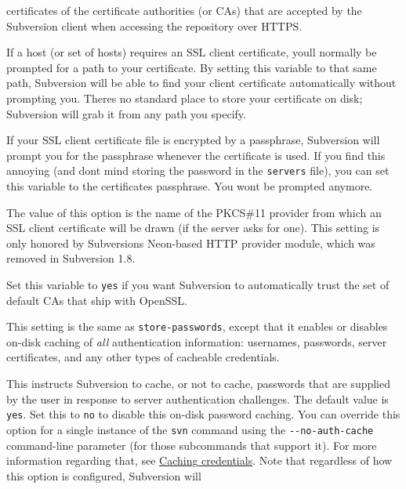 \begin{description}
certificates of the certificate authorities (or CAs) that are accepted
by the Subversion client when accessing the repository over HTTPS.
\item[\texttt{ssl-client-cert-file}]
If a host (or set of hosts) requires an SSL client certificate,
you\textquotesingle ll normally be prompted for a path to your
certificate. By setting this variable to that same path, Subversion will
be able to find your client certificate automatically without prompting
you. There\textquotesingle s no standard place to store your certificate
on disk; Subversion will grab it from any path you specify.
\item[\texttt{ssl-client-cert-password}]
If your SSL client certificate file is encrypted by a passphrase,
Subversion will prompt you for the passphrase whenever the certificate
is used. If you find this annoying (and don\textquotesingle t mind
storing the password in the \texttt{servers} file), you can set this
variable to the certificate\textquotesingle s passphrase. You
won\textquotesingle t be prompted anymore.
\item[\texttt{ssl-pkcs11-provider}]
The value of this option is the name of the PKCS\#11 provider from which
an SSL client certificate will be drawn (if the server asks for one).
This setting is only honored by Subversion\textquotesingle s Neon-based
HTTP provider module, which was removed in Subversion 1.8.
\item[\texttt{ssl-trust-default-ca}]
Set this variable to \texttt{yes} if you want Subversion to
automatically trust the set of default CAs that ship with OpenSSL.
\item[\texttt{store-auth-creds}]
This setting is the same as \texttt{store-passwords}, except that it
enables or disables on-disk caching of \emph{all} authentication
information: usernames, passwords, server certificates, and any other
types of cacheable credentials.
\item[\texttt{store-passwords}]
This instructs Subversion to cache, or not to cache, passwords that are
supplied by the user in response to server authentication challenges.
The default value is \texttt{yes}. Set this to \texttt{no} to disable
this on-disk password caching. You can override this option for a single
instance of the \texttt{svn} command using the
\texttt{-\/-no-auth-cache} command-line parameter (for those subcommands
that support it). For more information regarding that, see
\hyperref[svn.serverconfig.netmodel.credcache]{Caching credentials}.
Note that regardless of how this option is configured, Subversion will

\end{description}
